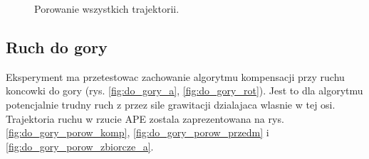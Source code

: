 

\begin{figure}[h]
	\centering
	\hfill
	\caption{Porowanie wszystkich trajektorii.}
	\label{fig:w_bok_miekki_porow_zbiorcze}
\end{figure}


\subsection{Ruch do gory}

Eksperyment ma przetestowac zachowanie algorytmu kompensacji przy ruchu koncowki do gory (rys. \ref{fig:do_gory_a}, \ref{fig:do_gory_rot}). Jest to dla algorytmu potencjalnie trudny ruch z przez sile grawitacji dzialajaca wlasnie w tej osi. Trajektoria ruchu w rzucie APE zostala zaprezentowana na rys. \ref{fig:do_gory_porow_komp}, \ref{fig:do_gory_porow_przedm} i \ref{fig:do_gory_porow_zbiorcze_a}.

